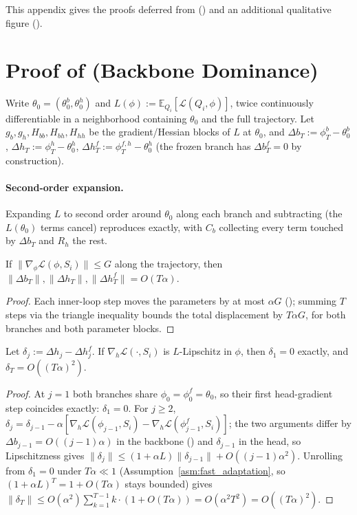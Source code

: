 This appendix gives the proofs deferred from  () and an additional qualitative figure ().

\section{Proof of  (Backbone Dominance)}
\label{app:taylor}

Write $\theta_0=(\theta_0^b,\theta_0^h)$ and $L(\phi):=\mathbb{E}_{Q_i}[\mathcal{L}(Q_i,\phi)]$, twice continuously differentiable in a neighborhood containing $\theta_0$ and the full trajectory. Let $g_b,g_h,H_{bb},H_{bh},H_{hh}$ be the gradient/Hessian blocks of $L$ at $\theta_0$, and $\Delta b_T:=\phi_T^b-\theta_0^b$, $\Delta h_T:=\phi_T^h-\theta_0^h$, $\Delta h_T^f:=\phi_T^{f,h}-\theta_0^h$ (the frozen branch has $\Delta b_T^f=0$ by construction).

\paragraph{Second-order expansion.} Expanding $L$ to second order around $\theta_0$ along each branch and subtracting (the $L(\theta_0)$ terms cancel) reproduces  exactly, with $C_b$ collecting every term touched by $\Delta b_T$ and $R_h$ the rest.

\begin{lemma}
\label{lem:displacement}
If $\|\nabla_\phi\mathcal{L}(\phi,S_i)\|\le G$ along the trajectory, then $\|\Delta b_T\|,\|\Delta h_T\|,\|\Delta h_T^f\|=O(T\alpha)$.
\end{lemma}
\begin{proof}
Each inner-loop step moves the parameters by at most $\alpha G$ (); summing $T$ steps via the triangle inequality bounds the total displacement by $T\alpha G$, for both branches and both parameter blocks.
\end{proof}

\begin{lemma}
\label{lem:head_div}
Let $\delta_j:=\Delta h_j-\Delta h_j^f$. If $\nabla_h\mathcal{L}(\cdot,S_i)$ is $L$-Lipschitz in $\phi$, then $\delta_1=0$ exactly, and $\delta_T=O((T\alpha)^2)$.
\end{lemma}
\begin{proof}
At $j{=}1$ both branches share $\phi_0=\phi_0^f=\theta_0$, so their first head-gradient step coincides exactly: $\delta_1=0$. For $j\ge2$, $\delta_j=\delta_{j-1}-\alpha[\nabla_h\mathcal{L}(\phi_{j-1},S_i)-\nabla_h\mathcal{L}(\phi_{j-1}^f,S_i)]$; the two arguments differ by $\Delta b_{j-1}=O((j{-}1)\alpha)$ in the backbone () and $\delta_{j-1}$ in the head, so Lipschitzness gives $\|\delta_j\|\le(1{+}\alpha L)\|\delta_{j-1}\|+O((j{-}1)\alpha^2)$. Unrolling from $\delta_1=0$ under $T\alpha\ll1$ (Assumption~\ref{asm:fast_adaptation}, so $(1+\alpha L)^{T}=1+O(T\alpha)$ stays bounded) gives $\|\delta_T\|\le O(\alpha^2)\sum_{k=1}^{T-1}k\cdot(1+O(T\alpha))=O(\alpha^2T^2)=O((T\alpha)^2)$.
\end{proof}

